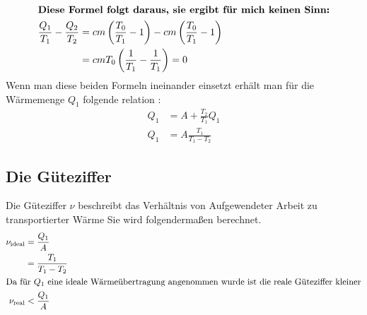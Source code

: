\begin{align*}
\intertext{\textbf{Diese Formel folgt daraus, sie ergibt für mich keinen Sinn:}}
    \frac{Q_{1}}{T_{1}} - \frac{Q_{2}}{T_{2}} &= c m \left(\frac{T_{0}}{T_{1}} - 1 \right) -c m \left(\frac{T_{0}}{T_{1}} - 1 \right) \\
     &= c m T_{0} \left(\frac{1}{T_{1}} - \frac{1}{T_{1}}\right) = 0
\end{align*}
Wenn man diese beiden Formeln ineinander einsetzt erhält man für die Wärmemenge $Q_1$ folgende relation \cite{man:v206}: 
\begin{align}
    Q_1 &= A + \frac{T_2}{T_1}Q_1 \\
    Q_1 &= A \frac{T_1}{T_1 - T_2}
\end{align}

\subsection{Die Güteziffer}
Die Güteziffer $ \nu $ beschreibt das Verhältnis von Aufgewendeter Arbeit zu transportierter Wärme \cite[vgl.][S.1]{man:v206}
Sie wird folgendermaßen berechnet.
\begin{align}
    \nu_{\text{ideal}} &= \frac{Q_{1}}{A} \\
    &= \frac{T_1}{T_1 - T_2}\\
    \label{eq:gueteTheorie}
    \intertext{Da für $ Q_1 $ eine ideale Wärmeübertragung angenommen wurde ist die reale Güteziffer kleiner}
    \nu_{\text{real}} &< \frac{Q_{1}}{A} 
\end{align}
